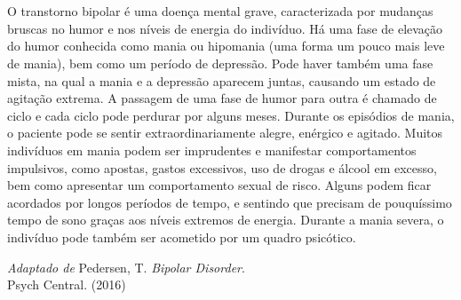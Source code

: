 
\chapter*{}

\epigraph{%
O transtorno bipolar é uma doença mental grave, caracterizada por mudanças 
bruscas no humor e nos níveis de energia do indivíduo. Há uma fase de elevação 
do humor conhecida como mania ou hipomania (uma forma um pouco mais leve de mania), 
bem como um período de depressão. Pode haver também uma fase mista, na qual a mania 
e a depressão aparecem juntas, causando um estado de agitação extrema. A passagem 
de uma fase de humor para outra é chamado de ciclo e cada ciclo pode perdurar por alguns meses.
Durante os episódios de mania, o paciente pode se sentir extraordinariamente alegre, 
enérgico e agitado. Muitos indivíduos em mania podem ser imprudentes e manifestar comportamentos 
impulsivos, como apostas, gastos excessivos, uso de drogas e álcool em excesso, bem como 
apresentar um comportamento sexual de risco. Alguns podem ficar acordados por longos períodos de 
tempo, e sentindo que precisam de pouquíssimo tempo de sono graças aos níveis extremos de energia. 
Durante a mania severa, o indivíduo pode também ser acometido por um quadro psicótico.
}{\emph{Adaptado de} Pedersen, T. \emph{Bipolar Disorder}.\\ Psych Central. (2016)}

\thispagestyle{empty}


%
%
%

